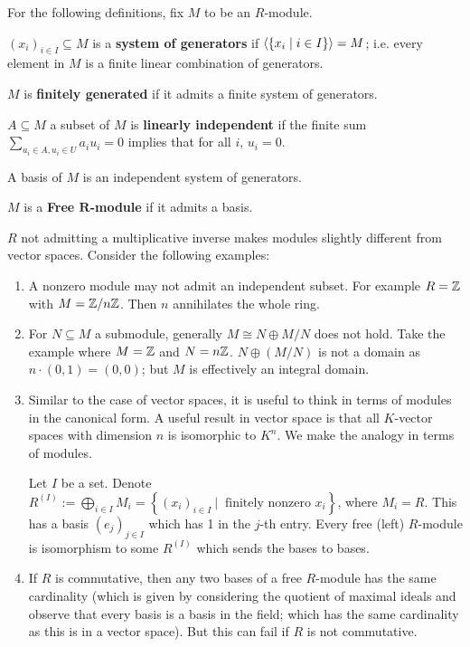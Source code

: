 \documentclass{article}
\begin{document}
For the following definitions, fix $M$ to be an $R$-module.
\begin{definition}
    $(x_i)_{i\in I} \subseteq M$ is a \textbf{system of generators} if $\left\langle \{x_i \mid i\in I \} \right\rangle = M$; i.e. every element in $M$ is a finite linear combination of generators.
\end{definition}

\begin{definition}
    $M$ is \textbf{finitely generated} if it admits a finite system of generators.
\end{definition}

\begin{definition}
    $A\subseteq M$ a subset of $M$ is \textbf{linearly independent} if the finite sum $\sum\limits_{a_i\in A, u_i\in U} a_i u_i = 0$ implies that for all $i$, $u_i = 0$.
\end{definition}

\begin{definition}[Basis]
    A basis of $M$ is an independent system of generators.
\end{definition}

\begin{definition}
    $M$ is a \textbf{Free $\bm{R}$-module} if it admits a basis.
\end{definition}

\begin{remark}
    $R$ not admitting a multiplicative inverse makes modules slightly different from vector spaces. Consider the following examples:
    \begin{enumerate}
        \item A nonzero module may not admit an independent subset. For example $R=\mathbb{Z}$ with $M = \mathbb{Z}/n\mathbb{Z}$. Then $n$ annihilates the whole ring.
        \item For $N\subseteq M$ a submodule, generally $M \cong N \oplus M/N$ does not hold. Take the example where $M = \mathbb{Z}$ and $N = n\mathbb{Z}$. $N \oplus (M/N)$ is not a domain as $n\cdot(0, 1) = (0, 0)$; but $M$ is effectively an integral domain.
        \item Similar to the case of vector spaces, it is useful to think in terms of modules in the canonical form. A useful result in vector space is that all $K$-vector spaces with dimension $n$ is isomorphic to $K^n$. We make the analogy in terms of modules. 
        
        Let $I$ be a set. Denote $R^{(I)} := \bigoplus_{i\in I} M_i = \left\{ (x_i)_{i\in I}\ \Big|\ \text{ finitely nonzero }x_i \right\}$, where $M_i = R$. This has a basis $(e_j)_{j\in I}$ which has 1 in the $j$-th entry. Every free (left) $R$-module is isomorphism to some $R^{(I)}$ which sends the bases to bases.
        \item If $R$ is commutative, then any two bases of a free $R$-module has the same cardinality (which is given by considering the quotient of maximal ideals and observe that every basis is a basis in the field; which has the same cardinality as this is in a vector space). But this can fail if $R$ is not commutative.
    \end{enumerate}
\end{remark}
\end{document}
